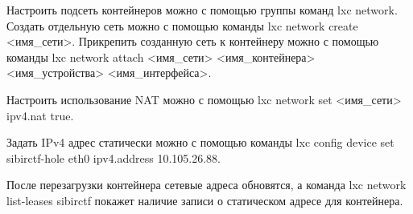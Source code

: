 Настроить подсеть контейнеров можно с помощью группы команд lxc network. Создать отдельную сеть можно с помощью команды lxc network create <имя\_сети>. Прикрепить созданную сеть к контейнеру можно с помощью команды lxc network attach <имя\_сети> <имя\_контейнера> <имя\_устройства> <имя\_интерфейса>.\par
Настроить использование NAT можно с помощью lxc network set <имя\_сети> ipv4.nat true.\par
Задать IPv4 адрес статически можно с помощью команды lxc config device set sibirctf-hole eth0 ipv4.address 10.105.26.88.\par
После перезагрузки контейнера сетевые адреса обновятся, а команда lxc network list-leases sibirctf покажет наличие записи о статическом адресе для контейнера.\par
 \clearpage